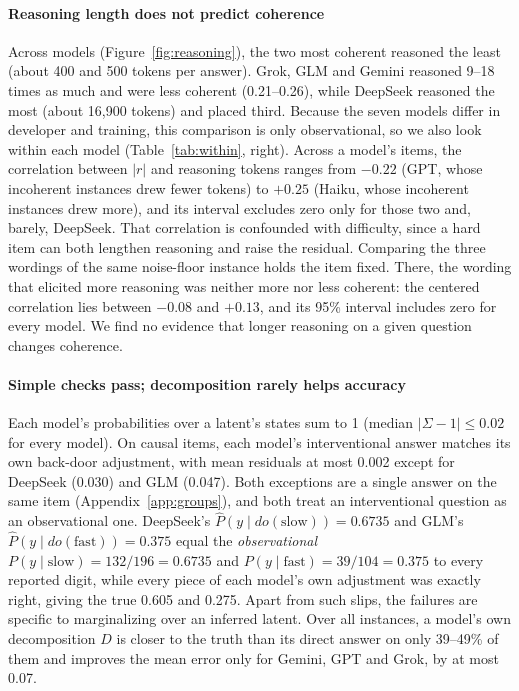 \documentclass[11pt]{article}
\newcommand{\phat}{\hat{P}}
\begin{document}
\paragraph{Reasoning length does not predict coherence} Across models (Figure~\ref{fig:reasoning}), the two most coherent reasoned the least (about 400 and 500 tokens per answer). Grok, GLM and Gemini reasoned 9--18 times as much and were less coherent (0.21--0.26), while DeepSeek reasoned the most (about 16,900 tokens) and placed third. Because the seven models differ in developer and training, this comparison is only observational, so we also look within each model (Table~\ref{tab:within}, right). Across a model's items, the correlation between $|r|$ and reasoning tokens ranges from $-0.22$ (GPT, whose incoherent instances drew fewer tokens) to $+0.25$ (Haiku, whose incoherent instances drew more), and its interval excludes zero only for those two and, barely, DeepSeek. That correlation is confounded with difficulty, since a hard item can both lengthen reasoning and raise the residual. Comparing the three wordings of the same noise-floor instance holds the item fixed. There, the wording that elicited more reasoning was neither more nor less coherent: the centered correlation lies between $-0.08$ and $+0.13$, and its 95\% interval includes zero for every model. We find no evidence that longer reasoning on a given question changes coherence.

\paragraph{Simple checks pass; decomposition rarely helps accuracy} Each model's probabilities over a latent's states sum to 1 (median $|\Sigma-1|\le 0.02$ for every model). On causal items, each model's interventional answer matches its own back-door adjustment, with mean residuals at most 0.002 except for DeepSeek (0.030) and GLM (0.047). Both exceptions are a single answer on the same item (Appendix~\ref{app:groups}), and both treat an interventional question as an observational one. DeepSeek's $\phat(y\mid do(\text{slow}))=0.6735$ and GLM's $\phat(y\mid do(\text{fast}))=0.375$ equal the \emph{observational} $P(y\mid\text{slow})=132/196=0.6735$ and $P(y\mid\text{fast})=39/104=0.375$ to every reported digit, while every piece of each model's own adjustment was exactly right, giving the true 0.605 and 0.275. Apart from such slips, the failures are specific to marginalizing over an inferred latent. Over all instances, a model's own decomposition $D$ is closer to the truth than its direct answer on only 39--49\% of them and improves the mean error only for Gemini, GPT and Grok, by at most 0.07.
\end{document}

